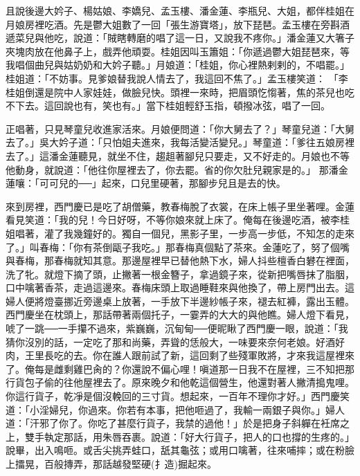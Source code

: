 且說後邊大妗子、楊姑娘、李嬌兒、孟玉樓、潘金蓮、李瓶兒、大姐，都伴桂姐在月娘房裡吃酒。先是鬱大姐數了一回「張生游寶塔」，放下琵琶。孟玉樓在旁斟酒遞菜兒與他吃，說道：「賊瞎轉磨的唱了這一日，又說我不疼你。」潘金蓮又大箸子夾塊肉放在他鼻子上，戲弄他頑耍。桂姐因叫玉簫姐：「你遞過鬱大姐琵琶來，等我唱個曲兒與姑奶奶和大妗子聽。」月娘道：「桂姐，你心裡熱剌剌的，不唱罷。」桂姐道：「不妨事。見爹娘替我說人情去了，我這回不焦了。」孟玉樓笑道： 「李桂姐倒還是院中人家娃娃，做臉兒快。頭裡一來時，把眉頭忔㥮著，焦的茶兒也吃不下去。這回說也有，笑也有。」當下桂姐輕舒玉指，頓撥冰弦，唱了一回。

正唱著，只見琴童兒收進家活來。月娘便問道：「你大舅去了？」琴童兒道：「大舅去了。」吳大妗子道：「只怕姐夫進來，我每活變活變兒。」琴童道：「爹往五娘房裡去了。」這潘金蓮聽見，就坐不住，趨趄著腳兒只要走，又不好走的。月娘也不等他動身，就說道：「他往你屋裡去了，你去罷。省的你欠肚兒親家是的。」 那潘金蓮嚷：「可可兒的──」起來，口兒里硬著，那腳步兒且是去的快。

來到房裡，西門慶已是吃了胡僧藥，教春梅脫了衣裳，在床上帳子里坐著哩。金蓮看見笑道：「我的兒！今日好呀，不等你娘來就上床了。俺每在後邊吃酒，被李桂姐唱著，灌了我幾鐘好的。獨自一個兒，黑影子里，一步高一步低，不知怎的走來了。」叫春梅：「你有茶倒甌子我吃。」那春梅真個點了茶來。金蓮吃了，努了個嘴與春梅，那春梅就知其意。那邊屋裡早已替他熱下水，婦人抖些檀香白礬在裡面，洗了牝。就燈下摘了頭，止撇著一根金簪子，拿過鏡子來，從新把嘴唇抹了脂胭，口中噙著香茶，走過這邊來。春梅床頭上取過睡鞋來與他換了，帶上房門出去。這婦人便將燈臺挪近旁邊桌上放著，一手放下半邊紗帳子來，褪去紅褲，露出玉體。西門慶坐在枕頭上，那話帶著兩個托子，一霎弄的大大的與他瞧。婦人燈下看見，唬了一跳──一手攥不過來，紫巍巍，沉甸甸──便昵瞅了西門慶一眼，說道：「我猜你沒別的話，一定吃了那和尚藥，弄聳的恁般大，一味要來奈何老娘。好酒好肉，王里長吃的去。你在誰人跟前試了新，這回剩了些殘軍敗將，才來我這屋裡來了。俺每是雌剩雞巴肏的？你還說不偏心哩！嗔道那一日我不在屋裡，三不知把那行貨包子偷的往他屋裡去了。原來晚夕和他乾這個營生，他還對著人撇清搗鬼哩。你這行貨子，乾凈是個沒輓回的三寸貨。想起來，一百年不理你才好。」西門慶笑道：「小淫婦兒，你過來。你若有本事，把他咂過了，我輸一兩銀子與你。」婦人道：「汗邪了你了。你吃了甚麼行貨子，我禁的過他！」於是把身子斜軃在衽席之上，雙手執定那話，用朱唇吞裹。說道：「好大行貨子，把人的口也撐的生疼的。」說畢，出入鳴咂。或舌尖挑弄蛙口，舐其龜弦；或用口噙著，往來哺摔；或在粉臉上擂晃，百般摶弄，那話越發堅硬(扌造)掘起來。

